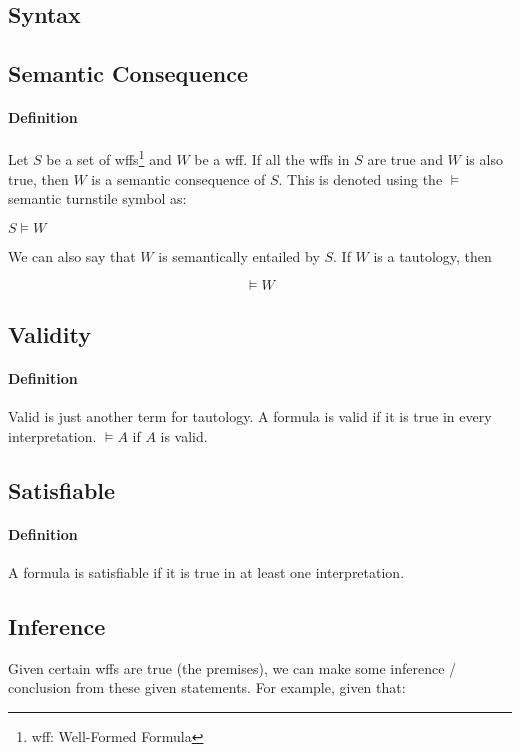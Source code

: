 \documentclass{article}
\theoremstyle{plain}
\theoremstyle{definition}
\begin{document}
\begin{multicols}{2}
  

\section{Syntax}

\subsection{Semantic Consequence}

\paragraph{Definition} Let $S$ be a set of wffs\footnote{wff: Well-Formed Formula} and $W$ be a wff. If all the wffs in $S$ are true and $W$ is also true, then $W$ is a semantic consequence of $S$. This is denoted using the $\vDash$ semantic turnstile symbol as:

$S \vDash W$

\noindent We can also say that $W$ is semantically entailed by $S$. If $W$ is a tautology, then

$$\vDash W$$

\subsection{Validity}

\paragraph{Definition} Valid is just another term for tautology. A formula is valid if it is true in every interpretation. $\vDash A$ if $A$ is valid.

\subsection{Satisfiable}

\paragraph{Definition} A formula is satisfiable if it is true in at least one interpretation.

\subsection{Inference}

Given certain wffs are true (the premises), we can make some inference / conclusion from these given statements. For example, given that:


\end{multicols}
\end{document}
